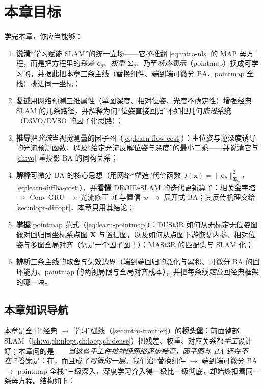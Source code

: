 \section*{本章目标}
学完本章，你应当能够：
\begin{enumerate}
  \item \textbf{说清}“学习赋能 SLAM”的统一立场——它\emph{不}推翻 \cref{eq:intro-nls} 的 MAP 母方程，而是把方程里的\emph{残差} $\mathbf{e}_\theta$、\emph{权重} $\boldsymbol\Sigma_\theta$、乃至\emph{状态表示}（pointmap）换成可学习的，并据此把本章三条主线（替换组件、端到端可微分 BA、pointmap 全栈）排进同一坐标；
  \item \textbf{复述}用网络预测三维属性（单图深度、相对位姿、光度不确定性）增强经典 SLAM 的几条路径，并解释为何“位姿直接回归”不如把几何\emph{嵌进}系统（D3VO/DVSO 的因子化思路）；
  \item \textbf{推导}把\emph{光流}当视觉测量的因子图（\cref{eq:learn-flow-cost}）：由位姿与逆深度诱导的光流预测函数、以及“给定光流反解位姿与深度”的最小二乘——并说清它与 \cref{ch:vo} 重投影 BA 的同构关系；
  \item \textbf{解释}可微分 BA 的核心思想（用网络“塑造”代价函数 $J(\mathbf{x})=\|\mathbf{e}_\theta\|^2_{\boldsymbol\Sigma_\theta}$，\cref{eq:learn-diffba-cost}），并\textbf{看懂} DROID-SLAM 的迭代更新算子：相关金字塔 $\to$ Conv-GRU $\to$ 光流修正 $\delta\mathbf{f}$ 与置信 $w$ $\to$ 展开式 BA；其反传机理交给 \cref{sec:nlopt-diffopt}，本章只用其结论；
  \item \textbf{掌握} pointmap 范式（\cref{eq:learn-pointmap}）：DUSt3R 如何从无标定无位姿图像对回归同坐标系点图 $\mathbf{X}$ 与置信图，以及如何从点图下游恢复内参、相对位姿与多图全局对齐（仍是一个因子图！）；MASt3R 的匹配头与 SLAM 化；
  \item \textbf{辨析}三条主线的取舍与失效边界（端到端回归的泛化与累积、可微分 BA 的回环能力、pointmap 的两视局限与全局对齐成本），并把每条线\emph{定位}回经典框架的哪一块。
\end{enumerate}

\subsection*{本章知识导航}
本章是全书“经典 $\to$ 学习”弧线（\cref{sec:intro-frontier}）的\textbf{桥头堡}：前面整部 SLAM（\cref{ch:vo,ch:nlopt,ch:loop,ch:dense}）把残差、权重、对应关系都\emph{手工}设计好；本章问的是——\emph{当这些手工件被神经网络逐步接管，因子图与 BA 还在不在？}答案是：在，而且成了\emph{可微的一层}。我们沿“替换组件 $\to$ 端到端可微分 BA $\to$ pointmap 全栈”三级深入，深度学习介入得一级比一级彻底，却始终扣着同一条母方程。结构如下：

